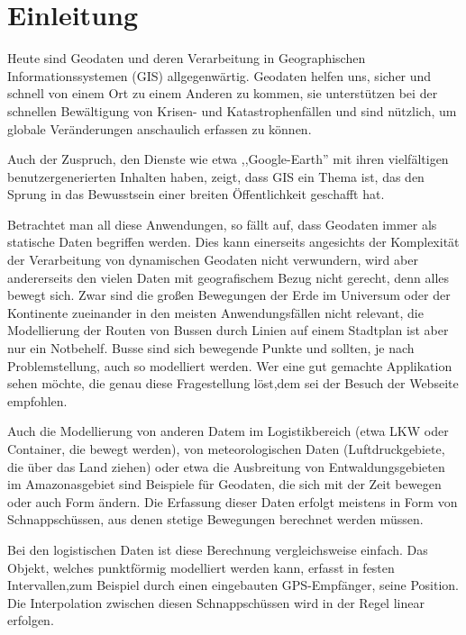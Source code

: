 
\chapter[Einleitung \anmerkung{ca. 5 Seiten}]{Einleitung} \label{Kapitel1}


Heute sind Geodaten und deren Verarbeitung  in Geographischen Informationssystemen (GIS) allgegenwärtig. Geodaten helfen uns, sicher und schnell von einem Ort zu einem Anderen zu kommen, sie unterstützen bei der schnellen Bewältigung von Krisen- und Katastrophenfällen und sind nützlich, um globale Veränderungen anschaulich erfassen zu können.

Auch der Zuspruch, den Dienste wie etwa ,,Google-Earth'' mit ihren vielfältigen benutzergenerierten Inhalten haben, zeigt, dass GIS ein Thema ist, das den Sprung in das Bewusstsein einer breiten Öffentlichkeit geschafft hat. 

Betrachtet man all diese Anwendungen, so fällt auf, dass Geodaten immer als statische Daten begriffen werden. Dies kann einerseits angesichts der Komplexität der Verarbeitung von dynamischen Geodaten nicht verwundern, wird aber andererseits den vielen Daten mit geografischem Bezug nicht gerecht, denn alles bewegt sich. Zwar sind die großen Bewegungen der Erde im Universum oder der Kontinente zueinander in den meisten Anwendungsfällen nicht relevant, die Modellierung der Routen von Bussen durch Linien auf einem Stadtplan ist aber nur ein Notbehelf. Busse sind sich bewegende Punkte und sollten, je nach Problemstellung, auch so modelliert werden. Wer eine gut gemachte Applikation sehen möchte, die genau diese Fragestellung löst,dem sei der Besuch der Webseite \cite{swR} empfohlen.

Auch die Modellierung von anderen Datem im Logistikbereich (etwa LKW oder Container, die bewegt werden), von meteorologischen Daten (Luftdruckgebiete, die über das Land ziehen) oder etwa die Ausbreitung von Entwaldungsgebieten im Amazonasgebiet sind Beispiele für Geodaten, die sich mit der Zeit bewegen oder auch Form ändern. Die Erfassung dieser  Daten erfolgt meistens in Form von Schnappschüssen, aus denen stetige Bewegungen berechnet werden müssen. 

Bei den logistischen Daten ist diese Berechnung vergleichsweise  einfach. Das Objekt, welches punktförmig modelliert werden kann, erfasst in festen Intervallen,zum Beispiel durch einen eingebauten GPS-Empfänger, seine Position.  Die Interpolation zwischen diesen Schnappschüssen wird in der Regel linear erfolgen. 

